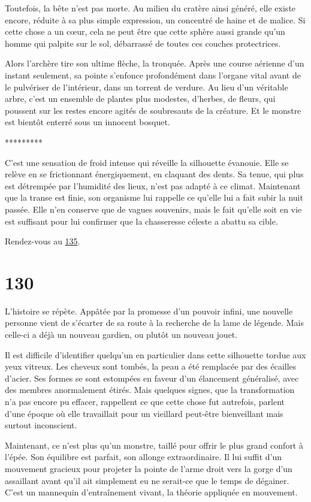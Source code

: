 \documentclass{report}
\newcommand{\gsection}[1]{
    \section{#1}
    \label{section-#1}
}
\newcommand{\glink}[1]{\hyperref[section-#1]{#1}}
\newcommand{\ellipse}{
    \begin{center}
        *********
    \end{center}
}
\begin{document}
Toutefois, la bête n'est pas morte. Au milieu du cratère ainsi généré, elle existe encore, réduite à sa plus simple expression, un concentré de haine et de malice. Si cette chose a un cœur, cela ne peut être que cette sphère aussi grande qu'un homme qui palpite sur le sol, débarrassé de toutes ces couches protectrices.

Alors l'archère tire son ultime flèche, la tronquée. Après une course aérienne d'un instant seulement, sa pointe s'enfonce profondément dans l'organe vital  avant de le pulvériser de l'intérieur, dans un torrent de verdure. Au lieu d'un véritable arbre, c'est un ensemble de plantes plus modestes, d'herbes, de fleurs, qui poussent sur les restes encore agités de soubresauts de la créature. Et le monstre est bientôt enterré sous un innocent bosquet.

\ellipse

C'est une sensation de froid intense qui réveille la silhouette évanouie. Elle se relève en se frictionnant énergiquement, en claquant des dents. Sa tenue, qui plus est détrempée par l'humidité des lieux, n'est pas adapté à ce climat. Maintenant que la transe est finie, son organisme lui rappelle ce qu'elle lui a fait subir la nuit passée. Elle n'en conserve que de vagues souvenirs, mais le fait qu'elle soit en vie est suffisant pour lui confirmer que la chasseresse céleste a abattu sa cible.

Rendez-vous au \glink{135}.

\gsection{130}

L'histoire se répète. Appâtée par la promesse d'un pouvoir infini, une nouvelle personne vient de s'écarter de sa route à la recherche de la lame de légende. Mais celle-ci a déjà un nouveau gardien, ou plutôt un nouveau jouet.

Il est difficile d'identifier quelqu'un en particulier dans cette silhouette tordue aux yeux vitreux. Les cheveux sont tombés, la peau a été remplacée par des écailles d'acier. Ses formes se sont estompées en faveur d'un élancement généralisé, avec des membres anormalement étirés. Mais quelques signes, que la transformation n'a pas encore pu effacer, rappellent ce que cette chose fut autrefois, parlent d'une époque où elle travaillait pour un vieillard peut-être bienveillant mais surtout inconscient.

Maintenant, ce n'est plus qu'un monstre, taillé pour offrir le plus grand confort à l'épée. Son équilibre est parfait, son allonge extraordinaire. Il lui suffit d'un mouvement gracieux pour projeter la pointe de l'arme droit vers la gorge d'un assaillant avant qu'il ait simplement eu ne serait-ce que le temps de dégainer. C'est un mannequin d'entraînement vivant, la théorie appliquée en mouvement.
\end{document}

